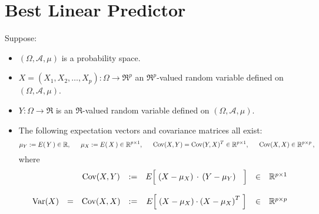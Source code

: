 

\section{Best Linear Predictor}
\setcounter{theorem}{0}
\setcounter{equation}{0}

\renewcommand{\theenumi}{\roman{enumi}}
\renewcommand{\labelenumi}{\textnormal{(\theenumi)}$\;\;$}


\begin{theorem}
\mbox{}
\vskip 0.2cm
\noindent
Suppose:
\begin{itemize}
\item
	$(\Omega,\mathcal{A},\mu)$ is a probability space.
\item
	$X = (X_{1}, X_{2}, \ldots, X_{p}) : \Omega \longrightarrow \Re^{p}$ an $\Re^{p}$-valued random variable
	defined on $(\Omega,\mathcal{A},\mu)$.
\item
	$Y : \Omega \longrightarrow \Re$ is an $\Re$-valued random variable
	defined on $(\Omega,\mathcal{A},\mu)$.
\item
	The following expectation vectors and covariance matrices all exist:
	\begin{equation*}
	\mu_{Y} := E\!\left(\,Y\,\right) \in \mathbb{R},
	\quad\;\;
	\mu_{X} := E\!\left(\,X\,\right) \in \mathbb{R}^{p \times 1},
	\quad\;\;
	\textnormal{Cov}(X,Y) = \textnormal{Cov}(Y,X)^{T} \in \mathbb{R}^{p \times 1},
	\quad\;\;
	\textnormal{Cov}(X,X) \in \mathbb{R}^{p \times p}\,,
	\end{equation*}
	where
	\begin{equation*}
	\begin{array}{ccccccc}
	&& \Cov(X,Y)
	&:=& E\!\left[\;\left(X-\mu_{X}\right)\overset{{\color{white}+}}{\cdot}\left(Y-\mu_{Y}\right)^{\color{white}T}\;\right]
	&\in& \Re^{p \times 1}
	\\ \\
	\Var(X)
	& = & \Cov(X,X)
	&:=& E\!\left[\;\left(X-\mu_{X}\right)\overset{{\color{white}.}}{\cdot}\left(X-\mu_{X}\right)^{T}\;\right]
	&\in& \Re^{p \times p}
	\end{array}

\end{equation*}
\end{itemize}
\end{theorem}
